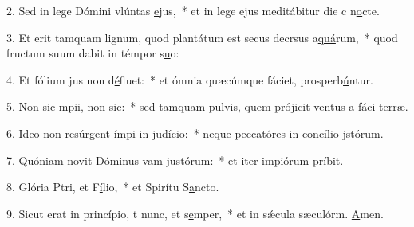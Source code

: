 2. Sed in lege Dómini vlúntas \uline{e}jus,~* et in lege ejus meditábitur die c n\uline{o}cte.\par 
3. Et erit tamquam lignum, quod plantátum est secus decrsus a\uline{quá}rum,~* quod fructum suum dabit in témpor s\uline{u}o:\par 
4. Et fólium jus non d\uline{é}fluet:~* et ómnia quæcúmque fáciet, prosperb\uline{ú}ntur.\par 
5. Non sic mpii, n\uline{o}n sic:~* sed tamquam pulvis, quem prójicit ventus a fáci t\uline{e}rræ.\par 
6. Ideo non resúrgent ímpi in jud\uline{í}cio:~* neque peccatóres in concílio jst\uline{ó}rum.\par 
7. Quóniam novit Dóminus vam just\uline{ó}rum:~* et iter impiórum pr\uline{í}bit.\par 
8. Glória Ptri, et F\uline{í}lio,~* et Spirítu S\uline{a}ncto.\par 
9. Sicut erat in princípio, t nunc, et s\uline{e}mper,~* et in sǽcula sæculórm. \uline{A}men.\par 
